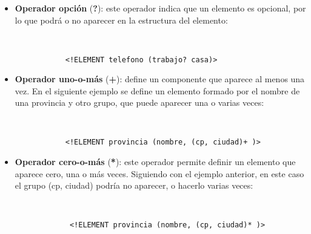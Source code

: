 \begin{itemize}
    \item \textbf{Operador opción} (\textbf{?}): este operador indica que un elemento es opcional, por lo que podrá o no aparecer en la estructura del elemento:

    \begin{figure}[H]
        \begin{tcolorbox}[sharp corners, colback=yellow!30, colframe=white!20]
            \scriptsize
            \begin{verbatim}


      <!ELEMENT telefono (trabajo? casa)>
            \end{verbatim}
        \end{tcolorbox}
    \end{figure}

    \item \textbf{Operador uno-o-más} (\textbf{+}): define un componente que aparece al menos una vez. En el siguiente ejemplo se define un elemento formado por el nombre de una provincia y otro grupo, que puede aparecer una o varias veces:

      \begin{figure}[H]
        \begin{tcolorbox}[sharp corners, colback=yellow!30, colframe=white!20]
            \scriptsize
            \begin{verbatim}


      <!ELEMENT provincia (nombre, (cp, ciudad)+ )>
            \end{verbatim}
        \end{tcolorbox}
    \end{figure}

    \item \textbf{Operador cero-o-más} (\textbf{*}): este operador permite definir un elemento que aparece cero, una o más veces. Siguiendo con el ejemplo anterior, en este caso el grupo (cp, ciudad) podría no aparecer, o hacerlo varias veces:

    \begin{figure}[H]
        \begin{tcolorbox}[sharp corners, colback=yellow!30, colframe=white!20]
            \scriptsize
            \begin{verbatim}


       <!ELEMENT provincia (nombre, (cp, ciudad)* )>
            \end{verbatim}
        \end{tcolorbox}
    \end{figure}


\end{itemize}
